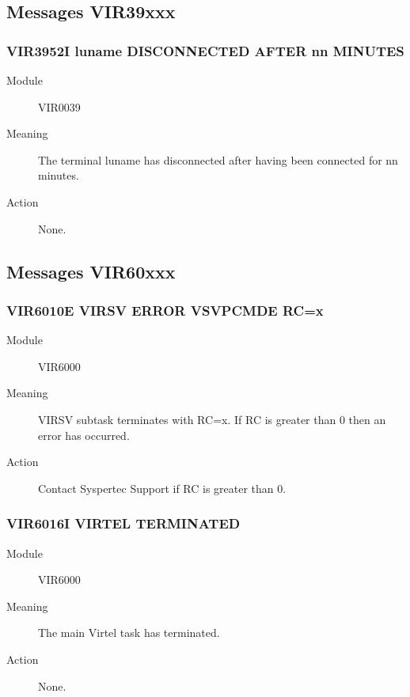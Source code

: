 \documentclass[letterpaper,10pt,english]{sphinxmanual}
\begin{document}
\subsection{Messages VIR39xxx}
\label{\detokenize{messages:messages-vir39xxx}}

\subsubsection{VIR3952I luname DISCONNECTED AFTER nn MINUTES}
\label{\detokenize{messages:vir3952i-luname-disconnected-after-nn-minutes}}\begin{description}
\item[{Module}] \leavevmode
VIR0039

\item[{Meaning}] \leavevmode
The terminal luname has disconnected after having been connected for nn minutes.

\item[{Action}] \leavevmode
None.

\end{description}


\subsection{Messages VIR60xxx}
\label{\detokenize{messages:messages-vir60xxx}}

\subsubsection{VIR6010E VIRSV ERROR VSVPCMDE RC=x}
\label{\detokenize{messages:vir6010e-virsv-error-vsvpcmde-rc-x}}\begin{description}
\item[{Module}] \leavevmode
VIR6000

\item[{Meaning}] \leavevmode
VIRSV subtask terminates with RC=x. If RC is greater than 0 then an error has occurred.

\item[{Action}] \leavevmode
Contact Syspertec Support if RC is greater than 0.

\end{description}


\subsubsection{VIR6016I VIRTEL TERMINATED}
\label{\detokenize{messages:vir6016i-virtel-terminated}}\begin{description}
\item[{Module}] \leavevmode
VIR6000

\item[{Meaning}] \leavevmode
The main Virtel task has terminated.

\item[{Action}] \leavevmode
None.

\end{description}
\end{document}
